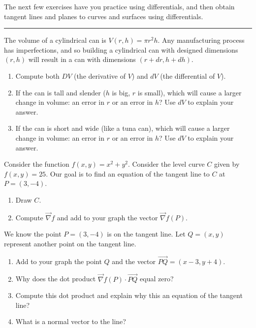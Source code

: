 The next few exercises have you practice using differentials, and then obtain tangent lines and planes to curves and surfaces using differentials.

\vskip0.1in
\hrule
\vskip0.1in

\begin{problem}
The volume of a cylindrical can is $V(r,h)=\pi r^2 h$. Any manufacturing process has imperfections, and so building a cylindrical can with designed dimensions $(r,h)$ will result in a can with dimensions $(r+dr,h+dh)$. 
\begin{enumerate}
 \item Compute both $DV$ (the derivative of $V$) and $dV$ (the differential of $V$).
 \item If the can is tall and slender ($h$ is big, $r$ is small), which will cause a larger change in volume: an error in $r$ or an error in $h$? Use $dV$ to explain your answer.
 \item If the can is short and wide (like a tuna can), which will cause a larger change in volume: an error in $r$ or an error in $h$? Use $dV$ to explain your answer.
\end{enumerate}
\end{problem}

\begin{problem}
 Consider the function $f(x,y)=x^2+y^2$.  Consider the level curve $C$ given by $f(x,y)=25$. Our goal is to find an equation of the tangent line to $C$ at $P=(3,-4)$.
\begin{enumerate}
	\item Draw $C$. 
	\item Compute $\vec \nabla f$ and add to your graph the vector $\vec \nabla f(P)$.
\end{enumerate}
We know the point $P=(3,-4)$ is on the tangent line. Let $Q=(x,y)$ represent another point on the tangent line. 
\begin{enumerate}[resume]
	\item Add to your graph the point $Q$ and the vector $\vec {PQ} = (x-3,y+4)$.
  \item Why does the dot product $\vec \nabla f(P)\cdot\vec{PQ}$ equal zero? 
	\item Compute this dot product and explain why this an equation of the tangent line?
  \item What is a normal vector to the line?
\end{enumerate}
\end{problem}

